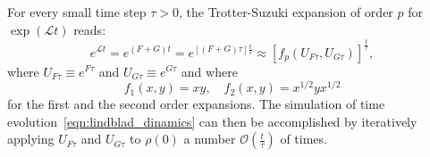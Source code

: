 For every small time step $\tau > 0$, the Trotter-Suzuki expansion of order $p$ for $\exp{(\mathcal{L} t)}$ reads:
\begin{equation}
    e^{\mathcal{L}t} = e^{(F+ G)t} = e^{[(F+ G)\tau]\frac{t}{\tau}} \approx [f_p(U_{F\tau}, U_{G\tau})]^{\frac{t}{\tau}},
\end{equation}
where $U_{F\tau} \equiv e^{F\tau}$ and $U_{G\tau} \equiv e^{G\tau}$ and where
\begin{equation}
    f_1(x,y) = xy, \quad f_2(x, y) = x^{1/2}yx^{1/2}
\end{equation}
for the first and the second order expansions.
The simulation of time evolution~\ref{eqn:lindblad_dinamics} can then be accomplished by iteratively applying $U_{F\tau}$ and $U_{G\tau}$ to $\rho(0)$ a number $\mathcal{O}(\frac{t}{\tau})$ of times.



